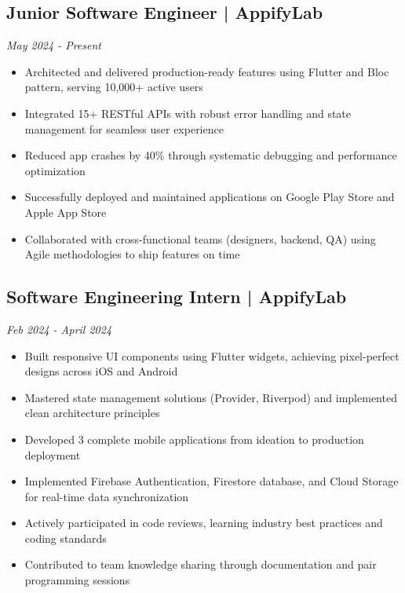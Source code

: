 \documentclass[a4paper,11pt]{article}
\begin{document}
\subsection{Junior Software Engineer | AppifyLab}
\textit{May 2024 - Present} \\
\begin{itemize}[leftmargin=*,noitemsep,topsep=4pt]
    \item Architected and delivered production-ready features using Flutter and Bloc pattern, serving 10,000+ active users
    \item Integrated 15+ RESTful APIs with robust error handling and state management for seamless user experience
    \item Reduced app crashes by 40\% through systematic debugging and performance optimization
    \item Successfully deployed and maintained applications on Google Play Store and Apple App Store
    \item Collaborated with cross-functional teams (designers, backend, QA) using Agile methodologies to ship features on time
\end{itemize}

\subsection{Software Engineering Intern | AppifyLab}
\textit{Feb 2024 - April 2024} \\
\begin{itemize}[leftmargin=*,noitemsep,topsep=4pt]
    \item Built responsive UI components using Flutter widgets, achieving pixel-perfect designs across iOS and Android
    \item Mastered state management solutions (Provider, Riverpod) and implemented clean architecture principles
    \item Developed 3 complete mobile applications from ideation to production deployment
    \item Implemented Firebase Authentication, Firestore database, and Cloud Storage for real-time data synchronization
    \item Actively participated in code reviews, learning industry best practices and coding standards
    \item Contributed to team knowledge sharing through documentation and pair programming sessions
\end{itemize}
\end{document}
